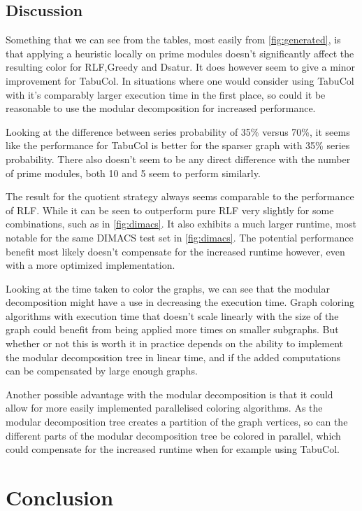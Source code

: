 \documentclass[a4paper]{article}
\begin{document}
\FloatBarrier
\subsection{Discussion}

Something that we can see from the tables, most easily from
\autoref{fig:generated}, is that applying a heuristic locally on prime modules
doesn't significantly affect the resulting color for RLF,Greedy and Dsatur. It
does however seem to give a minor improvement for TabuCol. In situations where
one would consider using TabuCol with it's comparably larger execution time in
the first place, so could it be reasonable to use the modular decomposition for
increased performance.

Looking at the difference between series probability of 35\% versus 70\%, it
seems like the performance for TabuCol is better for the sparser graph with
35\% series probability. There also doesn't seem to be any direct difference
with the number of prime modules, both 10 and 5 seem to perform similarly.

The result for the quotient strategy always seems comparable to the performance
of RLF. While it can be seen to outperform pure RLF very slightly for some
combinations, such as in \autoref{fig:dimacs}. It also exhibits a much larger
runtime, most notable for the same DIMACS test set in \autoref{fig:dimacs}.  The
potential performance benefit most likely doesn't compensate for the increased
runtime however, even with a more optimized implementation.

Looking at the time taken to color the graphs, we can see that the modular
decomposition might have a use in decreasing the execution time. Graph coloring
algorithms with execution time that doesn't scale linearly with the size of the
graph could benefit from being applied more times on smaller subgraphs. But
whether or not this is worth it in practice depends on the ability to implement
the modular decomposition tree in linear time, and if the added computations
can be compensated by large enough graphs.

Another possible advantage with the modular decomposition is that it could
allow for more easily implemented parallelised coloring algorithms. As the
modular decomposition tree creates a partition of the graph vertices, so can
the different parts of the modular decomposition tree be colored in parallel,
which could compensate for the increased runtime when for example using TabuCol.

\section{Conclusion}
\end{document}
